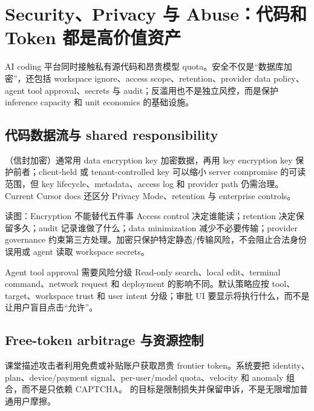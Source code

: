 \section{Security、Privacy 与 Abuse：代码和 Token 都是高价值资产}

AI coding 平台同时接触私有源代码和昂贵模型 quota。安全不仅是“数据库加密”，还包括 workspace ignore、access scope、retention、provider data policy、agent tool approval、secrets 与 audit；反滥用也不是独立风控，而是保护 inference capacity 和 unit economics 的基础设施。

\subsection{代码数据流与 shared responsibility}

（信封加密）通常用 data encryption key 加密数据，再用 key encryption key 保护前者；client-held 或 tenant-controlled key 可以缩小 server compromise 的可读范围，但 key lifecycle、metadata、access log 和 provider path 仍需治理。Current Cursor docs 还区分 Privacy Mode、retention 与 enterprise controls。


\begin{knowledgebox}{读图：Encryption 不能替代五件事}
Access control 决定谁能读；retention 决定保留多久；audit 记录谁做了什么；data minimization 减少不必要传输；provider governance 约束第三方处理。加密只保护特定静态/传输风险，不会阻止合法身份误用或 agent 读取 workspace secrets。
\end{knowledgebox}

\begin{warningbox}{Agent tool approval 需要风险分级}
Read-only search、local edit、terminal command、network request 和 deployment 的影响不同。默认策略应按 tool、target、workspace trust 和 user intent 分级；审批 UI 要显示将执行什么，而不是让用户盲目点击“允许”。
\end{warningbox}

\subsection{Free-token arbitrage 与资源控制}

课堂描述攻击者利用免费或补贴账户获取昂贵 frontier token。系统要把 identity、plan、device/payment signal、per-user/model quota、velocity 和 anomaly 组合，而不是只依赖 CAPTCHA。 的目标是限制损失并保留申诉，不是无限增加普通用户摩擦。

